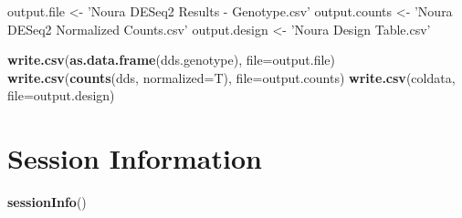 \documentclass[]{article}
\newenvironment{Shaded}{\begin{snugshade}}{\end{snugshade}}
\newcommand{\DataTypeTok}[1]{\textcolor[rgb]{0.13,0.29,0.53}{#1}}
\newcommand{\KeywordTok}[1]{\textcolor[rgb]{0.13,0.29,0.53}{\textbf{#1}}}
\newcommand{\NormalTok}[1]{#1}
\newcommand{\StringTok}[1]{\textcolor[rgb]{0.31,0.60,0.02}{#1}}
\begin{document}
\begin{Shaded}
\begin{Highlighting}[]
\NormalTok{output.file <-}\StringTok{ 'Noura DESeq2 Results - Genotype.csv'}
\NormalTok{output.counts <-}\StringTok{ 'Noura DESeq2 Normalized Counts.csv'}
\NormalTok{output.design <-}\StringTok{ 'Noura Design Table.csv'}

\KeywordTok{write.csv}\NormalTok{(}\KeywordTok{as.data.frame}\NormalTok{(dds.genotype), }\DataTypeTok{file=}\NormalTok{output.file)}
\KeywordTok{write.csv}\NormalTok{(}\KeywordTok{counts}\NormalTok{(dds, }\DataTypeTok{normalized=}\NormalTok{T), }\DataTypeTok{file=}\NormalTok{output.counts)}
\KeywordTok{write.csv}\NormalTok{(coldata, }\DataTypeTok{file=}\NormalTok{output.design)}
\end{Highlighting}
\end{Shaded}

\hypertarget{session-information}{%
\section{Session Information}\label{session-information}}

\begin{Shaded}
\begin{Highlighting}[]
\KeywordTok{sessionInfo}\NormalTok{()}
\end{Highlighting}
\end{Shaded}
\end{document}
